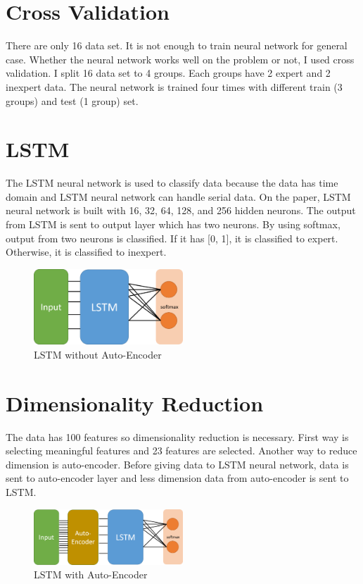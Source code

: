 \documentclass[draft,dvipsnames]{drexel-thesis}
\begin{document}
\begin{thesis}
\section{Cross Validation}
There are only 16 data set. It is not enough to train neural network for general case. Whether the neural network works well on the problem or not, I used cross validation. I split 16 data set to 4 groups. Each groups have 2 expert and 2 inexpert data. The neural network is trained four times with different train (3 groups) and test (1 group) set. 

\section{LSTM}
The LSTM neural network is used to classify data because the data has time domain and LSTM neural network can handle serial data. On the paper, LSTM neural network is built with 16, 32, 64, 128, and 256 hidden neurons. The output from LSTM is sent to output layer which has two neurons. By using softmax, output from two neurons is classified. If it has [0, 1], it is classified to expert. Otherwise, it is classified to inexpert.

\begin{figure}[H]
    \centering
    \includegraphics[width=0.5\textwidth]{pictures/applied_lstm.png}
    \caption{LSTM without Auto-Encoder}
    \label{fig:Applied LSTM}
\end{figure}

\section{Dimensionality Reduction}
The data has 100 features so dimensionality reduction is necessary. First way is selecting meaningful features and 23 features are selected. Another way to reduce dimension is auto-encoder. Before giving data to LSTM neural network, data is sent to auto-encoder layer and less dimension data from auto-encoder is sent to LSTM. 

\begin{figure}[H]
    \centering
    \includegraphics[width=0.5\textwidth]{pictures/applied_lstm_autoencoder.png}
    \caption{LSTM with Auto-Encoder}
    \label{fig:Applied LSTM With Auto-Encoder}
\end{figure}


\end{thesis}
\end{document}
